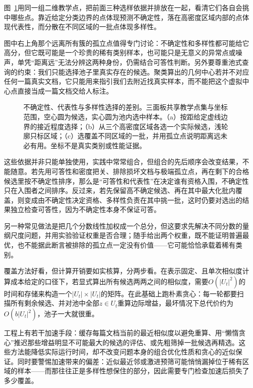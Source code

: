 图~\ref{fig:knowledge-acquisition-human-selection-criteria}用同一组二维教学点，把前面三种选样依据并排放在一起，看清它们各自会挑中哪些点。靠近给定分类边界的点体现预测不确定性，落在高密度区域内部的点体现代表性，而分散在不同区域的一批点体现多样性。

图中右上角那个远离所有簇的孤立点值得专门讨论：不确定性和多样性都可能给它高分，但它既可能是一个珍贵的稀有类别样本，也可能只是无意义的异常点或噪声，单凭“距离远”无法分辨这两种身份，仍需结合可答性判断。另外要尊重池式查询的约束：我们只能选择池子里真实存在的候选。聚类算出的几何中心若并不对应任何一篇真实文档，它只能用来指引我们去附近找真实样本，而不能把这个虚拟中心点直接当成一篇文档交给人标注。

\begin{figure}[htbp]
  \centering
  
  \caption{不确定性、代表性与多样性选择的差别。三面板共享教学点集与坐标范围，空心圆为候选，实心圆为池内选中样本。（a）按距给定虚线边界的接近程度选择；（b）从三个高密度区域各选一个实际候选，浅轮廓只标区域；（c）选覆盖不同区域的一批，并用孤立点说明距离远未必有用。坐标不是真实类别或性能证据。}
  \label{fig:knowledge-acquisition-human-selection-criteria}
\end{figure}

这些依据并非只能单独使用，实践中常常组合，但组合的先后顺序会改变结果，不能随意。若先用可答性和密度把关、排除损坏文档与极端孤立点，再在剩下的合格候选里按不确定性排序，那么是“可答性和代表性”在决定谁有资格入围，不确定性只在入围者之间排序。反过来，若先保留高不确定候选、再在其中最大化批内覆盖，则变成由不确定性决定资格、多样性负责在其中挑一批，这时仍要对选出的结果独立检查可答性，因为不确定性本身不保证可答。

另一种常见做法是把几个分数线性加权成一个总分，但这要求先解决不同分数的量纲尺度问题，并用实验验证权重是否合理；随手给出两个权重，既不能证明普遍最优，也不能据此断言被排除的孤立点一定没有价值——它可能恰恰承载着稀有类别。

覆盖方法好看，但计算开销要如实核算，分两步看。在表示固定、且单次相似度计算成本给定的口径下，若显式算出所有候选两两之间的相似度，需要$O(|U_t|^2)$的时间和存储来构造一个$|U_t|\times|U_t|$的矩阵。在此基础上跑朴素贪心：每一轮都要扫描所有剩余候选、并对池中全部$z\in U_t$重算边际增益，最坏情况下总代价约为$O(b|U_t|^2)$，池子一大就很重。

工程上有若干加速手段：缓存每篇文档当前的最近相似度以避免重算、用“懒惰贪心”推迟那些增益明显不可能最大的候选的评估、或先粗筛掉一批候选再精选。这些方法能降低实际运行时间，却不改变问题本身的组合优化性质和贪心的近似保证。同时要警惕加速带来的偏差：近似最近邻或激进预筛可能悄悄漏掉位于稀有区域的样本——而那往往正是多样性想保住的部分，因此需要专门检查加速后损失了多少覆盖。

